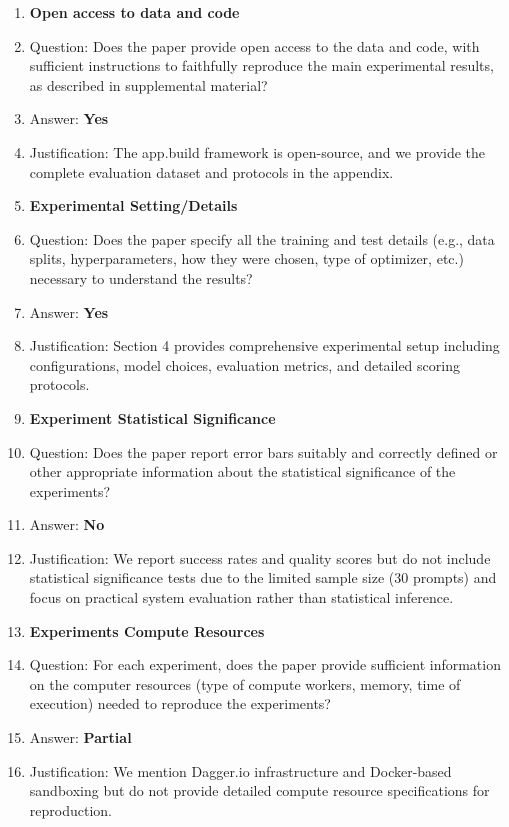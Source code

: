 \documentclass{article}
\begin{document}
\begin{enumerate}
\item {\bf Open access to data and code}
    \item[] Question: Does the paper provide open access to the data and code, with sufficient instructions to faithfully reproduce the main experimental results, as described in supplemental material?
    \item[] Answer: \textbf{Yes}
    \item[] Justification: The app.build framework is open-source, and we provide the complete evaluation dataset and protocols in the appendix.

\item {\bf Experimental Setting/Details}
    \item[] Question: Does the paper specify all the training and test details (e.g., data splits, hyperparameters, how they were chosen, type of optimizer, etc.) necessary to understand the results?
    \item[] Answer: \textbf{Yes}
    \item[] Justification: Section 4 provides comprehensive experimental setup including configurations, model choices, evaluation metrics, and detailed scoring protocols.

\item {\bf Experiment Statistical Significance}
    \item[] Question: Does the paper report error bars suitably and correctly defined or other appropriate information about the statistical significance of the experiments?
    \item[] Answer: \textbf{No}
    \item[] Justification: We report success rates and quality scores but do not include statistical significance tests due to the limited sample size (30 prompts) and focus on practical system evaluation rather than statistical inference.

\item {\bf Experiments Compute Resources}
    \item[] Question: For each experiment, does the paper provide sufficient information on the computer resources (type of compute workers, memory, time of execution) needed to reproduce the experiments?
    \item[] Answer: \textbf{Partial}
    \item[] Justification: We mention Dagger.io infrastructure and Docker-based sandboxing but do not provide detailed compute resource specifications for reproduction.


\end{enumerate}
\end{document}
